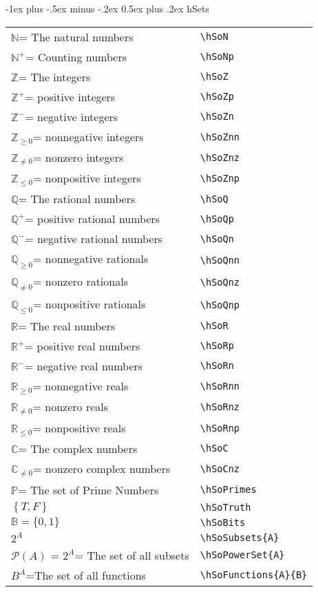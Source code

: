 \documentclass[a4paper,10pt,landscape]{article}
\makeatletter
\renewcommand{\section}{\@startsection{section}{1}{0mm}%
                                {-1ex plus -.5ex minus -.2ex}%
                                {0.5ex plus .2ex}%
                                {\normalfont\large\bfseries}}
\theoremstyle{definition}
\theoremstyle{remark}
\newcommand{\hSoN}  {\ensuremath{\mathbb{N}}}      %
\newcommand{\hSoNp} {\ensuremath{\mathbb{N}^{+}}} %
\newcommand{\hSoZ}  {\ensuremath{\mathbb{Z}}}      %
\newcommand{\hSoZp} {\ensuremath{\mathbb{Z}^{+}}} %
\newcommand{\hSoZn} {\ensuremath{\mathbb{Z}^{-}}} %
\newcommand{\hSoZnn}{\ensuremath{\mathbb{Z}_{\ge 0}}} %
\newcommand{\hSoZnz}{\ensuremath{\mathbb{Z}_{\neq 0}}} %
\newcommand{\hSoZnp}{\ensuremath{\mathbb{Z}_{\le 0}}} %
\newcommand{\hSoQ}  {\ensuremath{\mathbb{Q}}}      %
\newcommand{\hSoQp} {\ensuremath{\mathbb{Q}^{+}}} %
\newcommand{\hSoQn} {\ensuremath{\mathbb{Q}^{-}}} %
\newcommand{\hSoQnn}{\ensuremath{\mathbb{Q}_{\ge 0}}} %
\newcommand{\hSoQnz}{\ensuremath{\mathbb{Q}_{\neq 0}}} %
\newcommand{\hSoQnp}{\ensuremath{\mathbb{Q}_{\le 0}}} %
\newcommand{\hSoR}  {\ensuremath{\mathbb{R}}}      %
\newcommand{\hSoRp} {\ensuremath{\mathbb{R}^{+}}} %
\newcommand{\hSoRn} {\ensuremath{\mathbb{R}^{-}}} %
\newcommand{\hSoRnn}{\ensuremath{\mathbb{R}_{\ge 0}}} %
\newcommand{\hSoRnz}{\ensuremath{\mathbb{R}_{\neq 0}}} %
\newcommand{\hSoRnp}{\ensuremath{\mathbb{R}_{\le 0}}} %
\newcommand{\hSoC}  {\ensuremath{\mathbb{C}}}      %
\newcommand{\hSoCnz}{\ensuremath{\mathbb{C}_{\neq 0}}} %
\newcommand{\hSoPrimes}{\ensuremath{\mathbb{P}}} %
\newcommand{\hSoTruth}{\ensuremath{\left \{ T, F \right \}}} %
\newcommand{\hSoBits}{\ensuremath{\mathbb{B}}} %
\newcommand{\hSoFunctions}[2]{\ensuremath{#2^{#1}}} %
\newcommand{\hSoSubsets}[1]{\ensuremath{2^{#1}}} %
\newcommand{\hSoPowerSet}[1]{\ensuremath{\mathcal{P}(#1)}} %
\makeatother
\begin{document}
\begin{multicols}{3}
\section{hSets}
\begin{tabular}{@{}ll@{}}
	\hSoN = The natural numbers	&\verb!\hSoN!\\
	\hSoNp = Counting numbers	&\verb!\hSoNp!\\
	\hSoZ = The integers	&\verb!\hSoZ!\\
	\hSoZp = positive integers	&\verb!\hSoZp!\\
	\hSoZn = negative integers	&\verb!\hSoZn! \\
	\hSoZnn = nonnegative integers	&\verb!\hSoZnn!\\
	\hSoZnz = nonzero integers	&\verb!\hSoZnz!\\
	\hSoZnp = nonpositive integers	&\verb!\hSoZnp!\\
	\hSoQ = The rational numbers	&\verb!\hSoQ!\\
	\hSoQp = positive rational numbers	&\verb!\hSoQp!\\
	\hSoQn = negative rational numbers	&\verb!\hSoQn!\\
	\hSoQnn = nonnegative rationals	&\verb!\hSoQnn!\\
	\hSoQnz = nonzero rationals	&\verb!\hSoQnz!\\
	\hSoQnp = nonpositive rationals	&\verb!\hSoQnp!\\
	\hSoR = The real numbers	&\verb!\hSoR!\\
	\hSoRp = positive real numbers	&\verb!\hSoRp!\\
	\hSoRn = negative real numbers	&\verb!\hSoRn!\\
	\hSoRnn = nonnegative reals	&\verb!\hSoRnn!\\
	\hSoRnz = nonzero reals	&\verb!\hSoRnz!\\
	\hSoRnp = nonpositive reals	&\verb!\hSoRnp!\\
	\hSoC = The complex numbers	&\verb!\hSoC!\\
	\hSoCnz = nonzero complex numbers	&\verb!\hSoCnz!\\
	\hSoPrimes = The set of Prime Numbers	&\verb!\hSoPrimes!\\
	\hSoTruth	&\verb!\hSoTruth! \\
	$\hSoBits = \{ 0, 1 \}$	&\verb!\hSoBits!\\
	$\hSoSubsets{A}$	&\verb!\hSoSubsets{A}!\\
	$\hSoPowerSet{A}$ = $\hSoSubsets{A}$= The set of all subsets	&\verb!\hSoPowerSet{A}! \\
	$\hSoFunctions{A}{B}$=The set of all functions	&\verb!\hSoFunctions{A}{B}!\\
\end{tabular}
\end{multicols}
\end{document}
